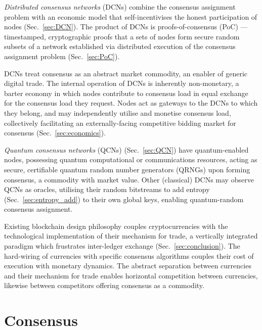 \documentclass[twocolumn, aps, amsmath, amssymb, nofootinbib, superscriptaddress, longbibliography, floatfix, eqsecnum, rmp]{revtex4-2}
\begin{document}
\emph{Distributed consensus networks} (DCNs) combine the consensus assignment problem with an economic model that self-incentivises the honest participation of nodes (Sec.~\ref{sec:DCN}). The product of DCNs is proofs-of-consensus (PoC) --- timestamped, cryptographic proofs that a sets of nodes form secure random subsets of a network established via distributed execution of the consensus assignment problem (Sec.~\ref{sec:PoC}).

DCNs treat consensus as an abstract market commodity, an enabler of generic digital trade. The internal operation of DCNs is inherently non-monetary, a barter economy in which nodes contribute to consensus load in equal exchange for the consensus load they request. Nodes act as gateways to the DCNs to which they belong, and may independently utilise and monetise consensus load, collectively facilitating an externally-facing competitive bidding market for consensus (Sec.~\ref{sec:economics}).

\emph{Quantum consensus networks} (QCNs) (Sec.~\ref{sec:QCN}) have quantum-enabled nodes, possessing quantum computational or communications resources, acting as secure, certifiable quantum random number generators (QRNGs) upon forming consensus, a commodity with market value. Other (classical) DCNs may observe QCNs as oracles, utilising their random bitstreams to add entropy (Sec.~\ref{sec:entropy_add}) to their own global keys, enabling quantum-random consensus assignment.

Existing blockchain design philosophy couples cryptocurrencies with the technological implementation of their mechanism for trade, a vertically integrated paradigm which frustrates inter-ledger exchange (Sec.~\ref{sec:conclusion}). The hard-wiring of currencies with specific consensus algorithms couples their cost of execution with monetary dynamics. The abstract separation between currencies and their mechanism for trade enables horizontal competition between currencies, likewise between competitors offering consensus as a commodity.

%
%
%


  
\section{Consensus} \label{sec:consensus}
\end{document}

